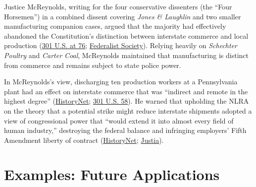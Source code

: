 \documentclass[12pt]{article}
\begin{document}
Justice McReynolds, writing for the four conservative dissenters (the ``Four Horsemen'') in a combined dissent covering \textit{Jones \& Laughlin} and two smaller manufacturing companion cases, argued that the majority had effectively abandoned the Constitution's distinction between interstate commerce and local production (\href{https://supreme.justia.com/cases/federal/us/301/58/}{301 U.S. at 76}; \href{https://fedsoc.org/case/nlrb-v-jones-laughlin-steel-corp}{Federalist Society}). Relying heavily on \textit{Schechter Poultry} and \textit{Carter Coal}, McReynolds maintained that manufacturing is distinct from commerce and remains subject to state police power.

In McReynolds's view, discharging ten production workers at a Pennsylvania plant had an effect on interstate commerce that was ``indirect and remote in the highest degree'' (\href{https://historynet.com/1937-labor-board-case-upheld-workers-right-to-organize/}{HistoryNet}; \href{https://supreme.justia.com/cases/federal/us/301/58/}{301 U.S. 58}). He warned that upholding the NLRA on the theory that a potential strike might reduce interstate shipments adopted a view of congressional power that ``would extend it into almost every field of human industry,'' destroying the federal balance and infringing employers' Fifth Amendment liberty of contract (\href{https://historynet.com/1937-labor-board-case-upheld-workers-right-to-organize/}{HistoryNet}; \href{https://supreme.justia.com/cases/federal/us/301/1/}{Justia}).

\section{Examples: Future Applications}
\end{document}
